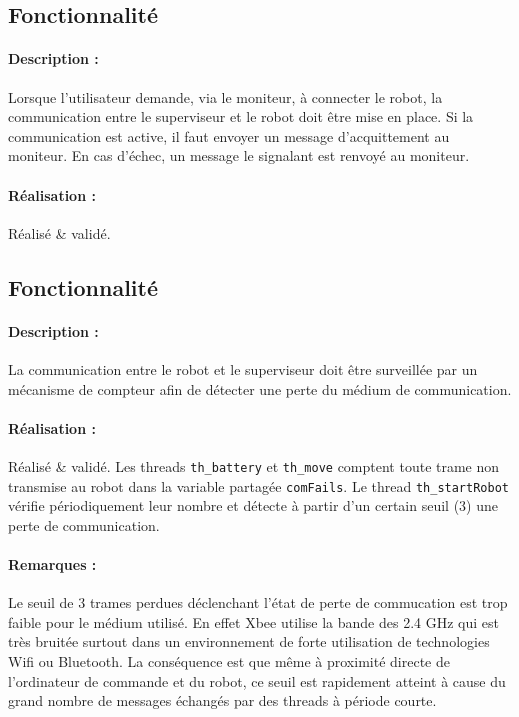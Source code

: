 \documentclass[11pt, a4paper]{paper}
\newcounter{cptreq}
\begin{document}
\subsection{Fonctionnalité \thecptreq}

\paragraph{Description :} Lorsque l'utilisateur demande, via le moniteur, à connecter le robot, la communication entre le superviseur et le robot doit être mise en place. Si la communication est active, il faut envoyer un message d'acquittement au moniteur. En cas d'échec, un message le signalant est renvoyé au moniteur.

\paragraph{\color{black}Réalisation :}  {\color{black} Réalisé \& validé.}

\subsection{Fonctionnalité \thecptreq}

\paragraph{Description :} La communication entre le robot et le superviseur doit être surveillée par un mécanisme de compteur afin de détecter une perte du médium de communication.

\paragraph{\color{black}Réalisation :}  {\color{black} Réalisé \& validé. Les threads {\tt th\_battery} et {\tt th\_move} comptent toute trame non transmise au robot dans la variable partagée {\tt comFails}. Le thread {\tt th\_startRobot} vérifie périodiquement leur nombre et détecte à partir d'un certain seuil (3) une perte de communication.}

\paragraph{\color{black}Remarques :}  {\color{black} Le seuil de 3 trames perdues déclenchant l'état de perte de commucation est trop faible pour le médium utilisé. En effet Xbee utilise la bande des 2.4 GHz qui est très bruitée surtout dans un environnement de forte utilisation de technologies Wifi ou Bluetooth. La conséquence est que même à proximité directe de l'ordinateur de commande et du robot, ce seuil est rapidement atteint à cause du grand nombre de messages échangés par des threads à période courte.}
\end{document}
